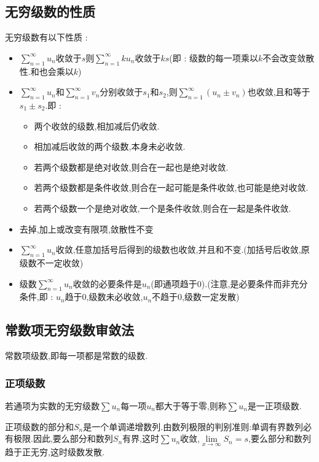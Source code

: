 \documentclass[UTF8,12pt]{ctexbook}
\newcommand{\limNormal}[1]{\lim\limits_{#1}}
\newcommand{\myLimToInf}{\limNormal{x \to \infty}}
\newcommand{\upDownSum}[2]{\sum\limits_{#2}^{#1}}
\newcommand{\sumSeries}{\upDownSum{\infty}{n = 1}}
\begin{document}
{{{\subsection{无穷级数的性质}{
  无穷级数有以下性质 :
  \begin{itemize}
    \item $\sumSeries u_n$收敛于$s$则$\sumSeries ku_n$收敛于$ks$(即 : 级数的每一项乘以$k$不会改变敛散性.和也会乘以$k$)
    \item {
          $\sumSeries u_n$和$\sumSeries v_n$分别收敛于$s_1$和$s_2$,则$\sumSeries (u_n \pm v_n)$也收敛,且和等于$s_1 \pm s_2$.即 :
          \begin{itemize}
            \item 两个收敛的级数,相加减后仍收敛.
            \item 相加减后收敛的两个级数,本身未必收敛.
            \item 若两个级数都是绝对收敛,则合在一起也是绝对收敛.
            \item 若两个级数都是条件收敛,则合在一起可能是条件收敛,也可能是绝对收敛.
            \item 若两个级数一个是绝对收敛,一个是条件收敛,则合在一起是条件收敛.
          \end{itemize}
          }
    \item 去掉,加上或改变有限项,敛散性不变
    \item $\sumSeries u_n$收敛,任意加括号后得到的级数也收敛,并且和不变.(加括号后收敛,原级数不一定收敛)
    \item 级数$\sumSeries u_n$收敛的必要条件是$u_n$(即通项趋于0).(注意,是必要条件而非充分条件,即 : $u_n$趋于0,级数未必收敛,$u_n$不趋于0,级数一定发散)
  \end{itemize}
}%

\subsection{常数项无穷级数审敛法}{
  常数项级数,即每一项都是常数的级数.

  \subsubsection{正项级数}{
    若通项为实数的无穷级数$\sum u_n$每一项$u_n$都大于等于零,则称$\sum u_n$是一正项级数.

    正项级数的部分和$S_n$是一个单调递增数列.由数列极限的判别准则:单调有界数列必有极限.因此,要么部分和数列$S_n$有界,这时$\sum u_n$收敛,$\myLimToInf S_n = s$,要么部分和数列趋于正无穷,这时级数发散.

}}}}}
\end{document}
